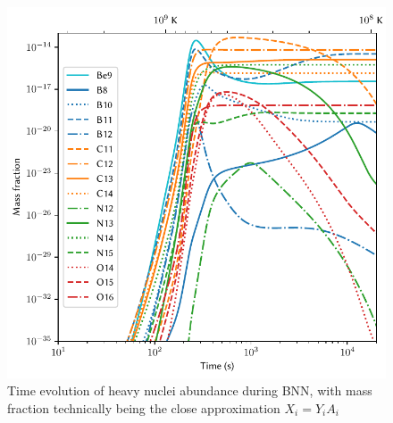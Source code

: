\begin{figure}[ht]
    \includegraphics[width=5.1in]{figures/abundanceheavy.pdf}
    \caption{Time evolution of heavy nuclei abundance during BNN, with mass fraction technically being the close approximation $X_i=Y_i A_i$}
    \label{fig:heavyXevo}
\end{figure}

